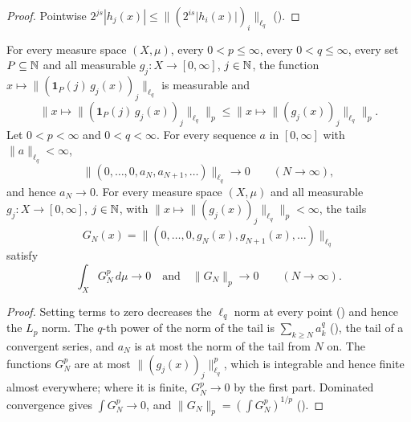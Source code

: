 \begin{proof}
\leanok
Pointwise $2^{js} |h_j(x)| \leq \|(2^{is} |h_i(x)|)_i\|_{\ell_q}$ ().
\end{proof}

\begin{lemma}
\label{lem:mixed-norm-tails}
\leanok
{}
For every measure space $(X, \mu)$, every $0 < p \leq \infty$, every $0 < q \leq \infty$, every
set $P \subseteq \mathbb{N}$ and all measurable $g_j \colon X \to [0, \infty]$, $j \in \mathbb{N}$, the function
$x \mapsto \|(\mathbf 1_P(j) \, g_j(x))_j\|_{\ell_q}$ is measurable and
\[
  \bigl\| x \mapsto \|(\mathbf 1_P(j) \, g_j(x))_j\|_{\ell_q} \bigr\|_p
  \leq \bigl\| x \mapsto \|(g_j(x))_j\|_{\ell_q} \bigr\|_p .
\]
Let $0 < p < \infty$ and $0 < q < \infty$. For every sequence $a$ in $[0, \infty]$ with
$\|a\|_{\ell_q} < \infty$,
\[
  \|(0, \dots, 0, a_N, a_{N+1}, \dots)\|_{\ell_q} \to 0 \qquad (N \to \infty) ,
\]
and hence $a_N \to 0$. For every measure space $(X, \mu)$ and all measurable
$g_j \colon X \to [0, \infty]$, $j \in \mathbb{N}$, with
$\bigl\| x \mapsto \|(g_j(x))_j\|_{\ell_q} \bigr\|_p < \infty$, the tails
\[
  G_N(x) = \|(0, \dots, 0, g_N(x), g_{N+1}(x), \dots)\|_{\ell_q}
\]
satisfy
\[
  \int_X G_N^p \, d\mu \to 0 \quad \text{and} \quad \|G_N\|_p \to 0 \qquad (N \to \infty) .
\]
\end{lemma}

\begin{proof}
\leanok
Setting terms to zero decreases the $\ell_q$ norm at every point () and hence
the $L_p$ norm. The $q$-th power of the norm of the tail is $\sum_{k \geq N} a_k^q$
(), the
tail of a convergent series, and $a_N$ is at most the norm of the tail from $N$ on. The
functions $G_N^p$ are at most
$\|(g_j(x))_j\|_{\ell_q}^p$, which is integrable and hence finite almost everywhere; where it is
finite, $G_N^p \to 0$ by the first part. Dominated convergence gives $\int G_N^p \to 0$, and
$\|G_N\|_p = (\int G_N^p)^{1/p}$ ().
\end{proof}


